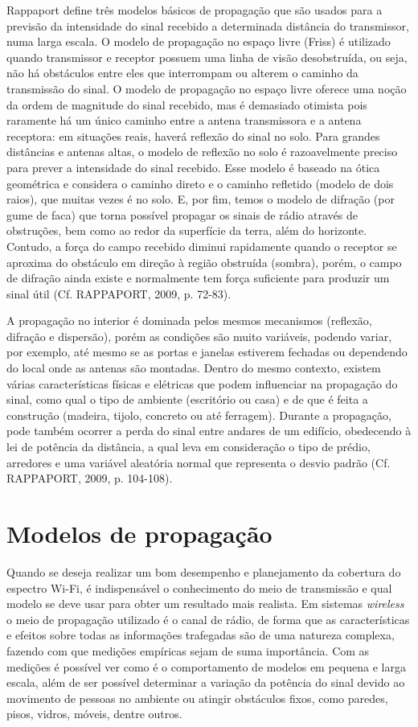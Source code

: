 \documentclass[
	12pt,				%
	openright,			%
	twoside,			%
	a4paper,			%
	english,			%
	french,				%
	spanish,			%
	brazil				%
	]{abntex2}
\begin{document}
Rappaport define três modelos básicos de propagação que são usados para a previsão da intensidade do sinal recebido a determinada distância do transmissor, numa larga escala. O modelo de propagação no espaço livre (Friss) é utilizado quando transmissor e receptor possuem uma linha de visão desobstruída, ou seja, não há obstáculos entre eles que interrompam ou alterem o caminho da transmissão do sinal. O modelo de propagação no espaço livre oferece uma noção da ordem de magnitude do sinal recebido, mas é demasiado otimista pois raramente há um único caminho entre a antena transmissora e a antena receptora: em situações reais, haverá reflexão do sinal no solo. Para grandes distâncias e antenas altas, o modelo de reflexão no solo é razoavelmente preciso para prever a intensidade do sinal recebido. Esse modelo é baseado na ótica geométrica e considera o caminho direto e o caminho refletido (modelo de dois raios), que muitas vezes é no solo. E, por fim, temos o modelo de difração (por gume de faca) que torna possível propagar os sinais de rádio através de obstruções, bem como ao redor da superfície da terra, além do horizonte. Contudo, a força do campo recebido diminui rapidamente quando o receptor se aproxima do obstáculo em direção à região obstruída (sombra), porém, o campo de difração ainda existe e normalmente tem força suficiente para produzir um sinal útil (Cf. RAPPAPORT, 2009, p. 72-83).

A propagação no interior é dominada pelos mesmos mecanismos (reflexão, difração e dispersão), porém as condições são muito variáveis, podendo variar, por exemplo, até mesmo se as portas e janelas estiverem fechadas ou dependendo do local onde as antenas são montadas. Dentro do mesmo contexto, existem várias características físicas e elétricas que podem influenciar na propagação do sinal, como qual o tipo de ambiente (escritório ou casa) e de que é feita a construção (madeira, tijolo, concreto ou até ferragem). Durante a propagação, pode também ocorrer a perda do sinal entre andares de um edifício, obedecendo à lei de potência da distância, a qual leva em consideração o tipo de prédio, arredores e uma variável aleatória normal que representa o desvio padrão (Cf. RAPPAPORT, 2009, p. 104-108). 


\section[Modelos de propagação]{Modelos de propagação}

Quando se deseja realizar um bom desempenho e planejamento da cobertura do espectro Wi-Fi, é indispensável o conhecimento do meio de transmissão e qual modelo se deve usar para obter um resultado mais realista. Em sistemas \textit{wireless} o meio de propagação utilizado é o canal de rádio, de forma que as características e efeitos sobre todas as informações trafegadas são de uma natureza complexa, fazendo com que medições empíricas sejam de suma importância. Com as medições é possível ver como é o comportamento de modelos em pequena e larga escala, além de ser possível determinar a variação da potência do sinal devido ao movimento de pessoas no ambiente ou atingir obstáculos fixos, como paredes, pisos, vidros, móveis, dentre outros.
\end{document}
